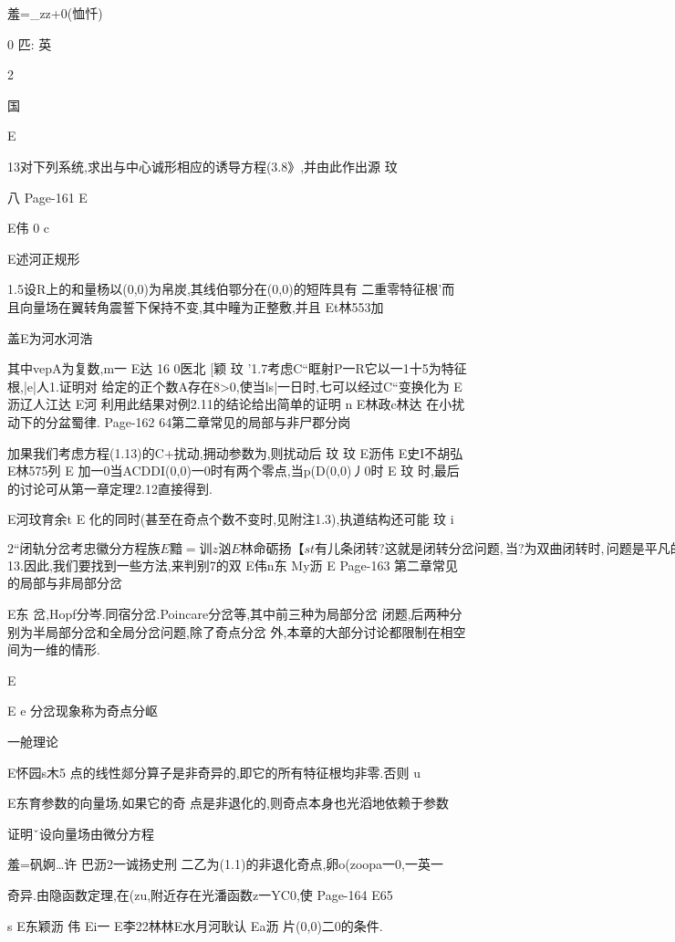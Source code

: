 {{{{{{{{{{{{{{{{{羞=_zz+0(恤忏)

0
匹:
英

2

国

E

13对下列系统,求出与中心诚形相应的诱导方程(3.8》,并由此作出源
玟

八
Page-161
E

E伟
0
c

E述河正规形

1.5设R上的和量杨以(0,0)为帛炭,其线伯鄂分在(0,0)的短阵具有
二重零特征根'而且向量场在翼转角震誓下保持不变,其中疃为正整敷,并且
Et林553加

盖E为河水河浩

其中vepA为复数,m一
E达
16
0医北
[颖
玟
'1.7考虑C“眶射P一R它以一1十5为特征根,|e|人1.证明对
给定的正个数A存在8>0,使当ls|一日时,七可以经过C“变换化为
E沥辽人江达
E河
利用此结果对例2.11的结论给出简单的证明
n
E林政c林达
在小扰动下的分盆蜀律.
Page-162
64第二章常见的局部与非尸郡分岗

加果我们考虑方程(1.13)的C+扰动,拥动参数为,则扰动后
玟
玟
E沥伟
E史I不胡弘
E林575列
E
加一0当ACDDI(0,0)一0时有两个零点,当p(D(0,0)丿0时
E
玟
时,最后的讨论可从第一章定理2.12直接得到.

E河玟育余t
E
化的同时(甚至在奇点个数不变时,见附注1.3),执道结构还可能
玟
i

$2“闭轨分岔

考忠徽分方程族
E黯=训z汹%

E林命砺扬
【st
有儿条闭转?这就是闭转分岔问题,当?为双曲闭转时,问题是平
凡的(见第一章$13.因此,我们要找到一些方法,来判别7的双
E伟n东
My沥
E
Page-163
第二章常见的局部与非局部分岔

E东
岔,Hopf分岑.同宿分岔.Poincare分岔等,其中前三种为局部分岔
闭题,后两种分别为半局部分岔和全局分岔问题,除了奇点分岔
外,本章的大部分讨论都限制在相空间为一维的情形.

E

E
e
分岔现象称为奇点分岖

一舱理论

E怀园s木5
点的线性郯分算子是非奇异的,即它的所有特征根均非零.否则
u

E东育参数的向量场,如果它的奇
点是非退化的,则奇点本身也光滔地依赖于参数

证明ˇ设向量场由微分方程

羞=矾婀…许
巴沥2一诚扬史刑
二乙为(1.1)的非退化奇点,卵o(zoopa一0,一英一

奇异.由隐函数定理,在(zu,附近存在光潘函数z一YC0,使
Page-164
E65

s
E东颖沥
伟
Ei一
E李22林林E水月河耿认
Ea沥
片(0,0)二0的条件.

}}}}}}}}}}}}}}}}}
